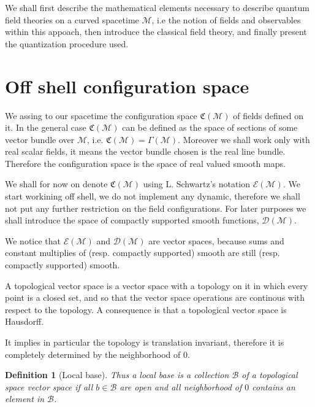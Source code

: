 \documentclass[10pt]{book}
\newcommand{\Bcal}{\mathcal{B}}
\newcommand{\Dcal}{\mathcal{D}}
\newcommand{\Ecal}{\mathcal{E}}
\newcommand{\Mcal}{\mathcal{M}}
\newcommand{\Crak}{\mathfrak{C}}
\theoremstyle{break}
\newtheorem{definition}{Definition}
\begin{document}
\bigskip


We shall first describe the mathematical elements necessary to describe quantum field theories on a curved spacetime $\Mcal$, i.e the notion of fields and observables within this appoach, then introduce the classical field theory, and finally present the quantization procedure used.


\section{Off shell configuration space}


We assing to our spacetime the configuration space $\Crak(\Mcal)$ of fields defined on it. In the general case $\Crak(\Mcal)$ can be defined as the space of sections of some vector bundle over $\Mcal$, i.e. $\Crak(\Mcal) = \Gamma(\Mcal)$. Moreover  we shall work only with real scalar  fields, it means the vector bundle chosen is the real line bundle. Therefore the configuration space is the space of real valued smooth maps.%


\bigskip


We shall for now on denote $\Crak(\Mcal)$ using L. Schwartz's notation $\Ecal(\Mcal)$. We start workining off shell, we do not implement any dynamic, therefore we shall not put any further restriction on the field configurations. For later purposes we shall introduce the space of compactly supported smooth functions, $\Dcal(\Mcal)$.


\bigskip


We notice that $\Ecal(\Mcal)$ and $\Dcal(\Mcal)$ are vector spaces, because sums and constant multiplies of (resp. compactly supported) smooth are still (resp. compactly supported) smooth. 


\bigskip


A topological vector space is a vector space with a topology on it in which every point is a closed set, and so that the vector space operations are continous with respect to the topology. A consequence is that a topological vector space is Hausdorff.

\bigskip


It implies in particular the topology is translation invariant, therefore it is completely determined by the neighborhood of $0$.

\begin{definition}[Local base]
Thus a local base is a collection $\Bcal$ of a  topological space vector space if all $b \in \Bcal$ are open and all neighborhood of $0$ contains an element in $\Bcal$.  
\end{definition}
\end{document}
